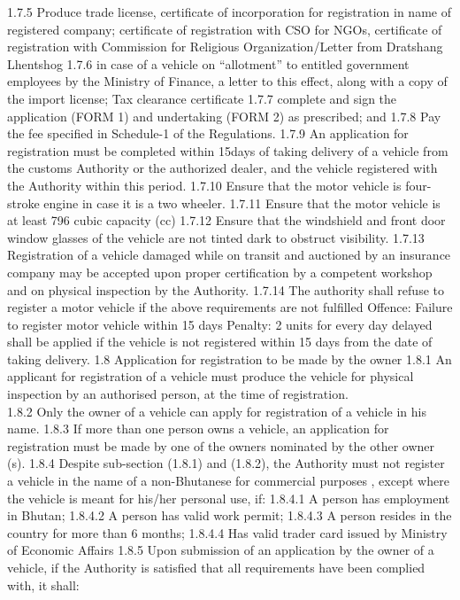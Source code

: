 \documentclass[
]{book}
\begin{document}
1.7.5 Produce trade license, certificate of incorporation for registration in name of registered company; certificate of registration with CSO for NGOs, certificate of registration with Commission for Religious Organization/Letter from Dratshang Lhentshog
1.7.6 in case of a vehicle on ``allotment'' to entitled government employees by the Ministry of Finance, a letter to this effect, along with a copy of the import license; Tax clearance certificate
1.7.7 complete and sign the application (FORM 1) and undertaking (FORM 2) as prescribed; and
1.7.8 Pay the fee specified in Schedule-1 of the Regulations.
1.7.9 An application for registration must be completed within 15days of taking delivery of a vehicle from the customs Authority or the authorized dealer, and the vehicle registered with the Authority within this period.
1.7.10 Ensure that the motor vehicle is four-stroke engine in case it is a two wheeler.
1.7.11 Ensure that the motor vehicle is at least 796 cubic capacity (cc)
1.7.12 Ensure that the windshield and front door window glasses of the vehicle are not tinted dark to obstruct visibility.
1.7.13 Registration of a vehicle damaged while on transit and auctioned by an insurance company may be accepted upon proper certification by a competent workshop and on physical inspection by the Authority.
1.7.14 The authority shall refuse to register a motor vehicle if the above requirements are not fulfilled
Offence: Failure to register motor vehicle within 15 days
Penalty: 2 units for every day delayed shall be applied if the vehicle is not registered within 15 days from the date of taking delivery.
1.8 Application for registration to be made by the owner
1.8.1 An applicant for registration of a vehicle must produce the vehicle for physical inspection by an authorised person, at the time of registration.\\
1.8.2 Only the owner of a vehicle can apply for registration of a vehicle in his name.
1.8.3 If more than one person owns a vehicle, an application for registration must be made by one of the owners nominated by the other owner (s).
1.8.4 Despite sub-section (1.8.1) and (1.8.2), the Authority must not register a vehicle in the name of a non-Bhutanese for commercial purposes , except where the vehicle is meant for his/her personal use, if:
1.8.4.1 A person has employment in Bhutan;
1.8.4.2 A person has valid work permit;
1.8.4.3 A person resides in the country for more than 6 months;
1.8.4.4 Has valid trader card issued by Ministry of Economic Affairs
1.8.5 Upon submission of an application by the owner of a vehicle, if the Authority is satisfied that all requirements have been complied with, it shall:
\end{document}
